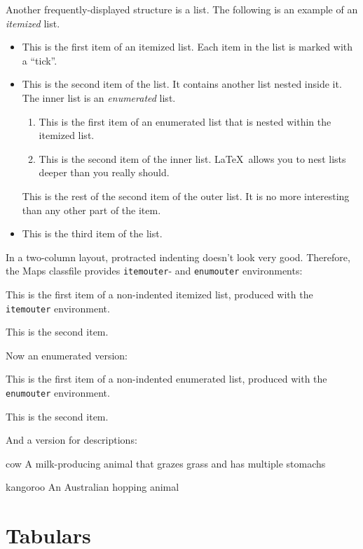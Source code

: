 \documentclass[nosubsub]{maps}
\begin{document}
Another frequently-displayed structure is a list.
The following is an example of an \emph{itemized}
list.
\begin{itemize}
  \item This is the first item of an itemized list.
    Each item in the list is marked with a ``tick''.
  \item This is the second item of the list.  It
    contains another list nested inside it.  The inner
    list is an \emph{enumerated} list.
    \begin{enumerate}
      \item This is the first item of an enumerated
        list that is nested within the itemized list.

      \item This is the second item of the inner list.
        \LaTeX\ allows you to nest lists deeper than
          you really should.
    \end{enumerate}
    This is the rest of the second item of the outer
    list.  It is no more interesting than any other
    part of the item.
  \item This is the third item of the list.
\end{itemize}
In a two-column layout, protracted indenting doesn't look very
good. Therefore, the Maps classfile provides \texttt{itemouter}- and
\texttt{enumouter} environments:
\begin{itemouter}
\item This is the first item of a non-indented itemized list,
  produced with the \texttt{itemouter} environment.
\item This is the second item.
\end{itemouter}
Now an enumerated version:
\begin{enumouter}
\item This is the first item of a non-indented enumerated list,
  produced with the \texttt{enumouter} environment.
\item This is the second item.
\end{enumouter}
And a version for descriptions:
\begin{descript}
\item[cow] A milk-producing animal that grazes grass and has
multiple stomachs
\item[kangoroo] An Australian hopping animal
\end{descript}

\section{Tabulars}
\end{document}
